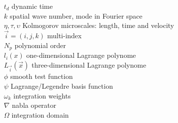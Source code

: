 \begin{tabbing}
$t_d$           \> dynamic time \\
$k$             \> spatial wave number, mode in Fourier space \\
$\eta,\tau,\upsilon$ \> Kolmogorov microscales: length, time and velocity \\
$\vec{i} = (i,j,k)$     \> multi-index \\
$N_p$           \> polynomial order \\
$l_{i}(x)$               \> one-dimensional Lagrange polynome \\
$L_{\vec{i}}(\vec{x})$   \> three-dimensional Lagrange polynome \\
$\phi$              \> smooth test function \\
$\psi$              \> Lagrange/Legendre basis function \\
$\omega_k$          \> integration weights \\
$\nabla$        \> nabla operator \\
$\Omega$        \> integration domain \\
\end{tabbing}

\newpage

